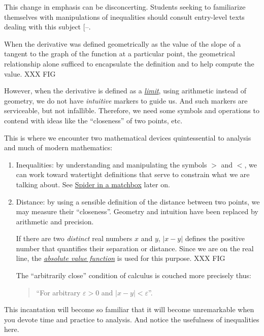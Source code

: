 \documentclass[
  a4paper,
]{article}
\begin{document}
This change in emphasis can be disconcerting. Students seeking to
familiarize themselves with manipulations of inequalities should consult
entry-level texts dealing with this subject
{[}--\citeproc{ref-alsina-nelsen-2009}{3}{]}.

When the derivative was defined geometrically as the value of the slope
of a tangent to the graph of the function at a particular point, the
geometrical relationship alone sufficed to encapsulate the definition
and to help compute the value. XXX FIG

However, when the derivative is defined as a
\href{https://en.wikipedia.org/wiki/Limit_(mathematics)}{\emph{limit}},
using arithmetic instead of geometry, we do not have \emph{intuitive}
markers to guide us. And such markers are serviceable, but not
infallible. Therefore, we need some symbols and operations to contend
with ideas like the ``closeness'' of two points, etc.

This is where we encounter two mathematical devices quintessential to
analysis and much of modern mathematics:

\begin{enumerate}
\def\labelenumi{\alph{enumi}.}
\item
  Inequalities: by understanding and manipulating the symbols \(>\) and
  \(<\), we can work toward watertight definitions that serve to
  constrain what we are talking about. See \href{}{Spider in a matchbox}
  later on.
\item
  Distance: by using a sensible definition of the distance between two
  points, we may measure their ``closeness''. Geometry and intuition
  have been replaced by arithmetic and precision.

  If there are two \emph{distinct} real numbers \(x\) and \(y\),
  \(|x - y|\) defines the positive number that quantifies their
  separation or distance. Since we are on the real line, the
  \href{https://mathworld.wolfram.com/AbsoluteValue.html}{\emph{absolute
  value function}} is used for this purpose. XXX FIG

  The ``arbitrarily close'' condition of calculus is couched more
  precisely thus:

  \begin{quote}
  ``For arbitrary \(\varepsilon > 0\) and \(| x - y | < \varepsilon\)''.
  \end{quote}
\end{enumerate}

This incantation will become so familiar that it will become
unremarkable when you devote time and practice to analysis. And notice
the usefulness of inequalities here.
\end{document}
